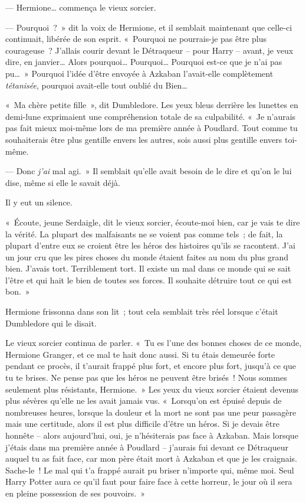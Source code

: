 --- Hermione… commença le vieux sorcier.

--- Pourquoi~?~» dit la voix de Hermione, et il semblait maintenant que celle-ci continuait, libérée de son esprit. «~Pourquoi ne pourrais-je pas être plus courageuse~? J'allais courir devant le Détraqueur -- pour Harry -- avant, je veux dire, en janvier… Alors pourquoi… Pourquoi… Pourquoi est-ce que je n'ai pas pu…~» Pourquoi l'idée d'être envoyée à Azkaban l'avait-elle complètement \emph{tétanisée}, pourquoi avait-elle tout oublié du Bien…

«~Ma chère petite fille~», dit Dumbledore. Les yeux bleus derrière les lunettes en demi-lune exprimaient une compréhension totale de sa culpabilité. «~Je n'aurais pas fait mieux moi-même lors de ma première année à Poudlard. Tout comme tu souhaiterais être plus gentille envers les autres, sois aussi plus gentille envers toi-même.

--- Donc \emph{j'ai} mal agi.~» Il semblait qu'elle avait besoin de le dire et qu'on le lui dise, même si elle le savait déjà.

Il y eut un silence.

«~Écoute, jeune Serdaigle, dit le vieux sorcier, écoute-moi bien, car je vais te dire la vérité. La plupart des malfaisants ne se voient pas comme tels~; de fait, la plupart d'entre eux se croient être les héros des histoires qu'ils se racontent. J'ai un jour cru que les pires choses du monde étaient faites au nom du plus grand bien. J'avais tort. Terriblement tort. Il existe un mal dans ce monde qui se sait l'être et qui hait le bien de toutes ses forces. Il souhaite détruire tout ce qui est bon.~»

Hermione frissonna dans son lit~; tout cela semblait très réel lorsque c'était Dumbledore qui le disait.

Le vieux sorcier continua de parler. «~Tu es l'une des bonnes choses de ce monde, Hermione Granger, et ce mal te hait donc aussi. Si tu étais demeurée forte pendant ce procès, il t'aurait frappé plus fort, et encore plus fort, jusqu'à ce que tu te brises. Ne pense pas que les héros ne peuvent être brisés~! Nous sommes seulement plus résistants, Hermione.~» Les yeux du vieux sorcier étaient devenus plus sévères qu'elle ne les avait jamais vus. «~Lorsqu'on est épuisé depuis de nombreuses heures, lorsque la douleur et la mort ne sont pas une peur passagère mais une certitude, alors il est plus difficile d'être un héros. Si je devais être honnête -- alors aujourd'hui, oui, je n'hésiterais pas face à Azkaban. Mais lorsque j'étais dans ma première année à Poudlard -- j'aurais fui devant ce Détraqueur auquel tu as fait face, car mon père était mort à Azkaban et que je les craignais. Sache-le~! Le mal qui t'a frappé aurait pu briser n'importe qui, même moi. Seul Harry Potter aura ce qu'il faut pour faire face à cette horreur, le jour où il sera en pleine possession de ses pouvoirs.~»


